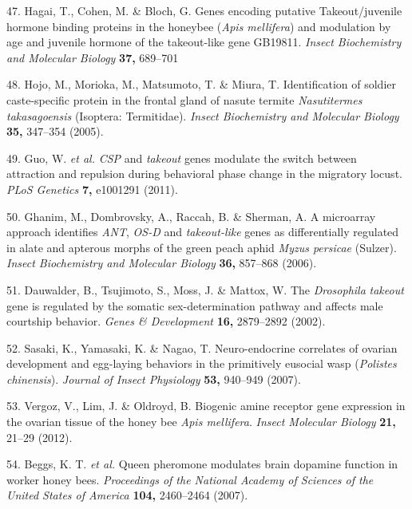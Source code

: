 \documentclass[12pt,]{article}
\begin{document}
\hypertarget{ref-Hagai:cp}{}
47. Hagai, T., Cohen, M. \& Bloch, G. Genes encoding putative
Takeout/juvenile hormone binding proteins in the honeybee (\emph{Apis
mellifera}) and modulation by age and juvenile hormone of the
takeout-like gene GB19811. \emph{Insect Biochemistry and Molecular
Biology} \textbf{37,} 689--701

\hypertarget{ref-Hojo:2005ht}{}
48. Hojo, M., Morioka, M., Matsumoto, T. \& Miura, T. Identification of
soldier caste-specific protein in the frontal gland of nasute termite
\emph{Nasutitermes takasagoensis} (Isoptera: Termitidae). \emph{Insect
Biochemistry and Molecular Biology} \textbf{35,} 347--354 (2005).

\hypertarget{ref-Guo:2011ks}{}
49. Guo, W. \emph{et al.} \emph{CSP} and \emph{takeout} genes modulate
the switch between attraction and repulsion during behavioral phase
change in the migratory locust. \emph{PLoS Genetics} \textbf{7,}
e1001291 (2011).

\hypertarget{ref-Ghanim:2006bb}{}
50. Ghanim, M., Dombrovsky, A., Raccah, B. \& Sherman, A. A microarray
approach identifies \emph{ANT}, \emph{OS-D} and \emph{takeout-like}
genes as differentially regulated in alate and apterous morphs of the
green peach aphid \emph{Myzus persicae} (Sulzer). \emph{Insect
Biochemistry and Molecular Biology} \textbf{36,} 857--868 (2006).

\hypertarget{ref-Dauwalder:2002ga}{}
51. Dauwalder, B., Tsujimoto, S., Moss, J. \& Mattox, W. The
\emph{Drosophila} \emph{takeout} gene is regulated by the somatic
sex-determination pathway and affects male courtship behavior.
\emph{Genes \& Development} \textbf{16,} 2879--2892 (2002).

\hypertarget{ref-sasaki2007ne}{}
52. Sasaki, K., Yamasaki, K. \& Nagao, T. Neuro-endocrine correlates of
ovarian development and egg-laying behaviors in the primitively eusocial
wasp (\emph{Polistes chinensis}). \emph{Journal of Insect Physiology}
\textbf{53,} 940--949 (2007).

\hypertarget{ref-vergoz2012bio}{}
53. Vergoz, V., Lim, J. \& Oldroyd, B. Biogenic amine receptor gene
expression in the ovarian tissue of the honey bee \emph{Apis mellifera}.
\emph{Insect Molecular Biology} \textbf{21,} 21--29 (2012).

\hypertarget{ref-Beggs:2007dm}{}
54. Beggs, K. T. \emph{et al.} Queen pheromone modulates brain dopamine
function in worker honey bees. \emph{Proceedings of the National Academy
of Sciences of the United States of America} \textbf{104,} 2460--2464
(2007).
\end{document}
